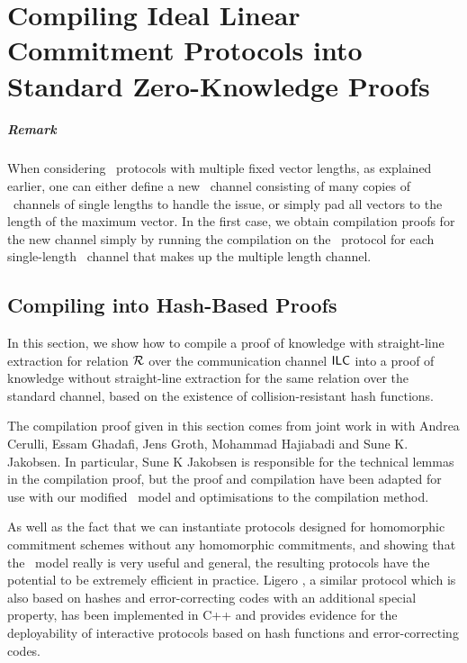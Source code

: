 \chapter{Compiling Ideal Linear Commitment Protocols into Standard Zero-Knowledge Proofs}
\label{chapterlabel:Compilation-Proof}

\paragraph{Remark} When considering \ILC\ protocols with multiple fixed vector lengths, as explained earlier, one can either define a new \ILC\ channel consisting of many copies of \ILC\ channels of single lengths to handle the issue, or simply pad all vectors to the length of the maximum vector. In the first case, we obtain compilation proofs for the new channel simply by running the compilation on the \ILC\ protocol for each single-length \ILC\ channel that makes up the multiple length channel.
%

\section{Compiling into Hash-Based Proofs}
\label{sec:IPCPgencon}\label{sec:ILCtoIOP}
In this section, we show how to compile a proof of knowledge with straight-line extraction for relation $\mathcal{R}$ over the communication channel $\mathsf{ILC}$ into a proof of knowledge without straight-line extraction for the same relation over the standard channel, based on the existence of collision-resistant hash functions.

The compilation proof given in this section comes from joint work in \cite{BootleCGGHJ17} with Andrea Cerulli, Essam Ghadafi, Jens Groth, Mohammad Hajiabadi and Sune K. Jakobsen. In particular, Sune K Jakobsen is responsible for the technical lemmas in the compilation proof, but the proof and compilation have been adapted for use with our modified \ILC\ model and optimisations to the compilation method.

As well as the fact that we can instantiate protocols designed for homomorphic commitment schemes without any homomorphic commitments, and showing that the \ILC\ model really is very useful and general, the resulting protocols have the potential to be extremely efficient in practice. Ligero \cite{CCS:AHIV17}, a similar protocol which is also based on hashes and error-correcting codes with an additional special property, has been implemented in C++ and provides evidence for the deployability of interactive protocols based on hash functions and error-correcting codes.

